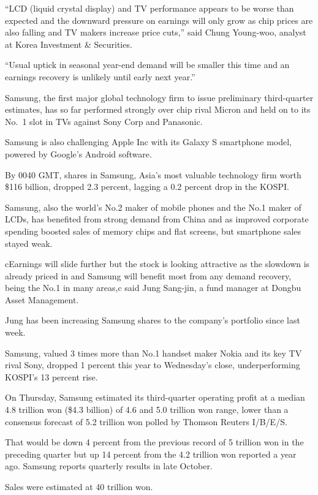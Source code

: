 ﻿\documentclass[12pt]{article}
\begin{document}
``LCD (liquid crystal display) and TV performance appears to be worse than expected and the downward
pressure on earnings will only grow as chip prices are also falling and TV makers increase price
cuts,'' said Chung Young-woo, analyst at Korea Investment \& Securities.

``Usual uptick in seasonal year-end demand will be smaller this time and an earnings recovery is
unlikely until early next year.''

Samsung, the first major global technology firm to issue preliminary third-quarter estimates, has so
far performed strongly over chip rival Micron and held on to its No.~1 slot in TVs against Sony Corp
and Panasonic.

Samsung is also challenging Apple Inc with its Galaxy S smartphone model, powered by Google's
Android software.

By 0040 GMT, shares in Samsung, Asia's most valuable technology firm worth \$116 billion, dropped
2.3 percent, lagging a 0.2 percent drop in the KOSPI.

Samsung, also the world's No.2 maker of mobile phones and the No.1 maker of LCDs, has benefited from
strong demand from China and as improved corporate spending boosted sales of memory chips and flat
screens, but smartphone sales stayed weak.

cEarnings will slide further but the stock is looking attractive as the slowdown is already priced
in and Samsung will benefit most from any demand recovery, being the No.1 in many areas,c said Jung
Sang-jin, a fund manager at Dongbu Asset Management.

Jung has been increasing Samsung shares to the company's portfolio since last week.

Samsung, valued 3 times more than No.1 handset maker Nokia and its key TV rival Sony, dropped 1
percent this year to Wednesday's close, underperforming KOSPI's 13 percent rise.

On Thursday, Samsung estimated its third-quarter operating profit at a median 4.8 trillion won
(\$4.3 billion) of 4.6 and 5.0 trillion won range, lower than a consensus forecast of 5.2 trillion
won polled by Thomson Reuters I/B/E/S.

That would be down 4 percent from the previous record of 5 trillion won in the preceding quarter but
up 14 percent from the 4.2 trillion won reported a year ago. Samsung reports quarterly results in
late October.

Sales were estimated at 40 trillion won.
\end{document}
